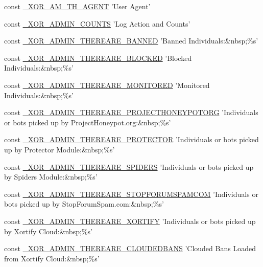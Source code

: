 \begin{DoxyCompactItemize}
\item 
const \hyperlink{admin_8php_a558fca7a89d9fef674ad44fbc3f0ffdc}{\-\_\-\-X\-O\-R\-\_\-\-A\-M\-\_\-\-T\-H\-\_\-\-A\-G\-E\-N\-T} 'User Agent'
\item 
const \hyperlink{admin_8php_a50dfb93eafeab6f8c92bd87c54a4e3a3}{\-\_\-\-X\-O\-R\-\_\-\-A\-D\-M\-I\-N\-\_\-\-C\-O\-U\-N\-T\-S} 'Log Action and Counts'
\item 
const \hyperlink{admin_8php_a834918998aca006f698e20c388cf89e5}{\-\_\-\-X\-O\-R\-\_\-\-A\-D\-M\-I\-N\-\_\-\-T\-H\-E\-R\-E\-A\-R\-E\-\_\-\-B\-A\-N\-N\-E\-D} 'Banned Individuals\-:\&nbsp;\%s'
\item 
const \hyperlink{admin_8php_ae91edf969356174ec66dc2592084b91f}{\-\_\-\-X\-O\-R\-\_\-\-A\-D\-M\-I\-N\-\_\-\-T\-H\-E\-R\-E\-A\-R\-E\-\_\-\-B\-L\-O\-C\-K\-E\-D} 'Blocked Individuals\-:\&nbsp;\%s'
\item 
const \hyperlink{admin_8php_a04c16d37c64d208172b86684f1bc311f}{\-\_\-\-X\-O\-R\-\_\-\-A\-D\-M\-I\-N\-\_\-\-T\-H\-E\-R\-E\-A\-R\-E\-\_\-\-M\-O\-N\-I\-T\-O\-R\-E\-D} 'Monitored Individuals\-:\&nbsp;\%s'
\item 
const \hyperlink{admin_8php_a912087e6835ed6dc88251691d27a02ab}{\-\_\-\-X\-O\-R\-\_\-\-A\-D\-M\-I\-N\-\_\-\-T\-H\-E\-R\-E\-A\-R\-E\-\_\-\-P\-R\-O\-J\-E\-C\-T\-H\-O\-N\-E\-Y\-P\-O\-T\-O\-R\-G} 'Individuals or bots picked up by Project\-Honeypot.\-org\-:\&nbsp;\%s'
\item 
const \hyperlink{admin_8php_ab53ea620611ab351f4a9acf2c47db63e}{\-\_\-\-X\-O\-R\-\_\-\-A\-D\-M\-I\-N\-\_\-\-T\-H\-E\-R\-E\-A\-R\-E\-\_\-\-P\-R\-O\-T\-E\-C\-T\-O\-R} 'Individuals or bots picked up by Protector Module\-:\&nbsp;\%s'
\item 
const \hyperlink{admin_8php_adc22fe7fc7d8e65bcb8799ed2f002fe1}{\-\_\-\-X\-O\-R\-\_\-\-A\-D\-M\-I\-N\-\_\-\-T\-H\-E\-R\-E\-A\-R\-E\-\_\-\-S\-P\-I\-D\-E\-R\-S} 'Individuals or bots picked up by Spiders Module\-:\&nbsp;\%s'
\item 
const \hyperlink{admin_8php_ab3cfb616ea50c853d840ae592cecbf61}{\-\_\-\-X\-O\-R\-\_\-\-A\-D\-M\-I\-N\-\_\-\-T\-H\-E\-R\-E\-A\-R\-E\-\_\-\-S\-T\-O\-P\-F\-O\-R\-U\-M\-S\-P\-A\-M\-C\-O\-M} 'Individuals or bots picked up by Stop\-Forum\-Spam.\-com\-:\&nbsp;\%s'
\item 
const \hyperlink{admin_8php_a839ff2c39ee9ff8f0d93da6c0f0626dc}{\-\_\-\-X\-O\-R\-\_\-\-A\-D\-M\-I\-N\-\_\-\-T\-H\-E\-R\-E\-A\-R\-E\-\_\-\-X\-O\-R\-T\-I\-F\-Y} 'Individuals or bots picked up by Xortify Cloud\-:\&nbsp;\%s'
\item 
const \hyperlink{admin_8php_a7c17f435033a48b5c83f6d93a06a667d}{\-\_\-\-X\-O\-R\-\_\-\-A\-D\-M\-I\-N\-\_\-\-T\-H\-E\-R\-E\-A\-R\-E\-\_\-\-C\-L\-O\-U\-D\-E\-D\-B\-A\-N\-S} 'Clouded Bans Loaded from Xortify Cloud\-:\&nbsp;\%s'

\end{DoxyCompactItemize}
